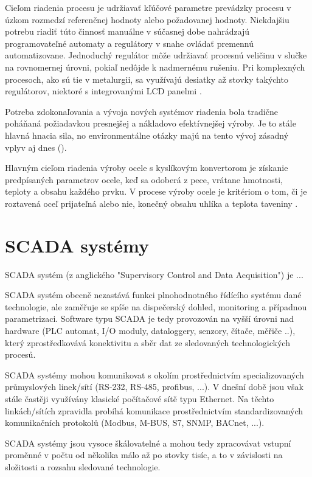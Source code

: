 \documentclass[]{tukediphc}
\begin{document}
Cieľom riadenia procesu je udržiavať kľúčové parametre prevádzky procesu v úzkom rozmedzí referenčnej hodnoty alebo požadovanej hodnoty. Niekdajšiu potrebu riadiť túto činnosť manuálne v súčasnej dobe nahrádzajú programovateľné automaty a regulátory v snahe ovládať premennú automatizovane. Jednoduchý regulátor môže udržiavať procesnú veličinu v slučke na rovnomernej úrovni, pokiaľ nedôjde k nadmernému rušeniu. Pri komplexných procesoch, ako sú tie v metalurgii, sa využívajú desiatky až stovky takýchto regulátorov, niektoré s integrovanými LCD panelmi \citep{Al-Megren2016}.

Potreba zdokonaľovania a vývoja nových systémov riadenia bola tradične poháňaná požiadavkou presnejšej a nákladovo efektívnejšej výroby. Je to stále hlavná hnacia sila, no environmentálne otázky majú na tento vývoj zásadný vplyv aj dnes (\cite{Widlund1998}).

Hlavným cieľom riadenia výroby ocele s kyslíkovým konvertorom je získanie predpísaných parametrov ocele, keď sa odoberá z pece, vrátane hmotnosti, teploty a obsahu každého prvku. V procese výroby ocele je kritériom o tom, či je roztavená oceľ prijateľná alebo nie, konečný obsahu uhlíka a teplota taveniny \cite{Wang2010}.



\section{SCADA systémy}

SCADA systém (z anglického "Supervisory Control and Data Acquisition") je ...

SCADA systém obecně nezastává funkci plnohodnotného řídícího systému dané technologie, ale zaměřuje se spíše na dispečerský dohled, monitoring a případnou parametrizaci. Software typu SCADA je tedy provozován na vyšší úrovni nad hardware (PLC automat, I/O moduly, dataloggery, senzory, čítače, měřiče ..), který zprostředkovává konektivitu a sběr dat ze sledovaných technologických procesů.

SCADA systémy mohou komunikovat s okolím prostřednictvím specializovaných průmyslových linek/sítí (RS-232, RS-485, profibus, ...). V dnešní době jsou však stále častěji využívány klasické počítačové sítě typu Ethernet. Na těchto linkách/sítích zpravidla probíhá komunikace prostřednictvím standardizovaných komunikačních protokolů (Modbus, M-BUS, S7, SNMP, BACnet, ...).

SCADA systémy jsou vysoce škálovatelné a mohou tedy zpracovávat vstupní proměnné v počtu od několika málo až po stovky tisíc, a to v závislosti na složitosti a rozsahu sledované technologie.
\end{document}
